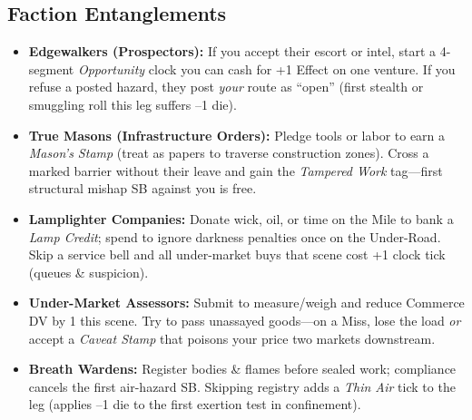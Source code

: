 \subsection*{Faction Entanglements}
\begin{itemize}
  \item \textbf{Edgewalkers (Prospectors):} If you accept their escort or intel, start a 4-segment \emph{Opportunity} clock you can cash for +1 Effect on one venture. If you refuse a posted hazard, they post \emph{your} route as “open” (first stealth or smuggling roll this leg suffers --1 die).
  \item \textbf{True Masons (Infrastructure Orders):} Pledge tools or labor to earn a \emph{Mason’s Stamp} (treat as papers to traverse construction zones). Cross a marked barrier without their leave and gain the \emph{Tampered Work} tag—first structural mishap SB against you is free.
  \item \textbf{Lamplighter Companies:} Donate wick, oil, or time on the Mile to bank a \emph{Lamp Credit}; spend to ignore darkness penalties once on the Under-Road. Skip a service bell and all under-market buys that scene cost +1 clock tick (queues \& suspicion).
  \item \textbf{Under-Market Assessors:} Submit to measure/weigh and reduce Commerce DV by 1 this scene. Try to pass unassayed goods—on a Miss, lose the load \emph{or} accept a \emph{Caveat Stamp} that poisons your price two markets downstream.
  \item \textbf{Breath Wardens:} Register bodies \& flames before sealed work; compliance cancels the first air-hazard SB. Skipping registry adds a \emph{Thin Air} tick to the leg (applies --1 die to the first exertion test in confinement).
\end{itemize}

